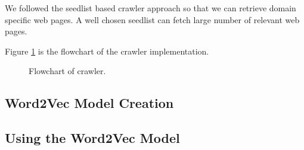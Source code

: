     We followed the seedlist based crawler approach so that we can retrieve
    domain specific web pages. A well chosen seedlist can fetch large number
    of relevant web pages.

 Figure \ref{fig:crawleralgo} is the flowchart of the crawler implementation.
\begin{figure}[htbp]
\centering
{}
\caption{Flowchart of crawler.}
\label{fig:crawleralgo}
\end{figure}

\subsection{Word2Vec Model Creation} \label{createmodelsection}


\subsection{Using the Word2Vec Model} \label{usemodel}



